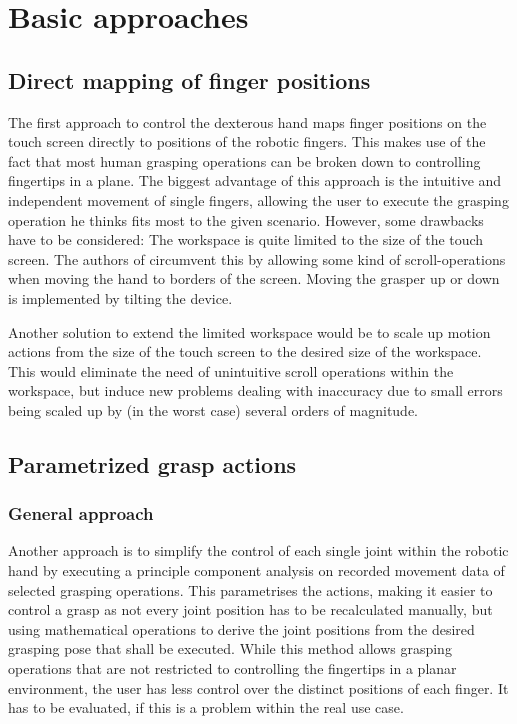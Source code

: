 \documentclass[a4paper]{article}
\begin{document}
\section{Basic approaches}

\subsection{Direct mapping of finger positions}
\label{sec:direct}
The first approach to control the dexterous hand maps finger positions on the touch screen directly to positions of the robotic fingers. This makes use of the fact that most human grasping operations can be broken down to controlling fingertips in a plane\cite[1]{conf/humanoids/TohHLBZP12}. The biggest advantage of this approach is the intuitive and independent movement of single fingers, allowing the user to execute the grasping operation he thinks fits most to the given scenario. However, some drawbacks have to be considered: The workspace is quite limited to the size of the touch screen. The authors of \cite{conf/humanoids/TohHLBZP12} circumvent this by allowing some kind of scroll-operations when moving the hand to borders of the screen. Moving the grasper up or down is implemented by tilting the device.

Another solution to extend the limited workspace would be to scale up motion actions from the size of the touch screen to the desired size of the workspace. This would eliminate the need of unintuitive scroll operations within the workspace, but induce new problems dealing with inaccuracy due to small errors being scaled up by (in the worst case) several orders of magnitude. 

\subsection{Parametrized grasp actions}

\subsubsection{General approach}

Another approach is to simplify the control of each single joint within the robotic hand by executing a principle component analysis on recorded movement data of selected grasping operations\cite{uhh/techrep/paramnewactions}. This parametrises the actions, making it easier to control a grasp as not every joint position has to be recalculated manually, but using mathematical operations to derive the joint positions from the desired grasping pose that shall be executed. While this method allows grasping operations that are not restricted to controlling the fingertips in a planar environment, the user has less control over the distinct positions of each finger. It has to be evaluated, if this is a problem within the real use case.
\end{document}
